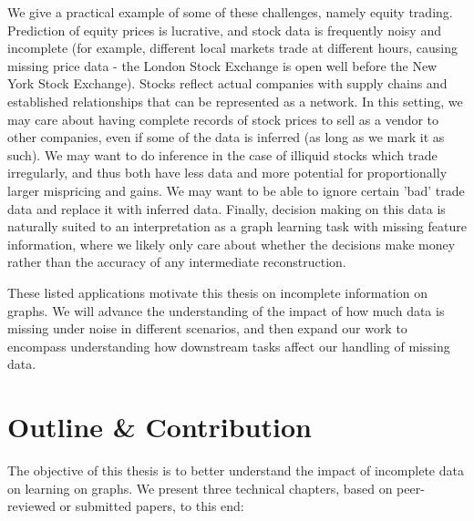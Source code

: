     We give a practical example of some of these challenges, namely equity trading. Prediction of equity prices is lucrative, and stock data is frequently noisy and incomplete (for example, different local markets trade at different hours, causing missing price data - the London Stock Exchange is open well before the New York Stock Exchange). Stocks reflect actual companies with supply chains and established relationships that can be represented as a network. In this setting, we may care about having complete records of stock prices to sell as a vendor to other companies, even if some of the data is inferred (as long as we mark it as such). We may want to do inference in the case of illiquid stocks which trade irregularly, and thus both have less data and more potential for proportionally larger mispricing and gains. We may want to be able to ignore certain 'bad' trade data and replace it with inferred data. Finally, decision making on this data is naturally suited to an interpretation as a graph learning task with missing feature information, where we likely only care about whether the decisions make money rather than the accuracy of any intermediate reconstruction.
    

These listed applications motivate this thesis on incomplete information on graphs. We will advance the understanding of the impact of how much data is missing under noise in different scenarios, and then expand our work to encompass understanding how downstream tasks affect our handling of missing data.

\section{Outline \& Contribution}
The objective of this thesis is to better understand the impact of incomplete data on learning on graphs. We present three technical chapters, based on peer-reviewed or submitted papers, to this end:

